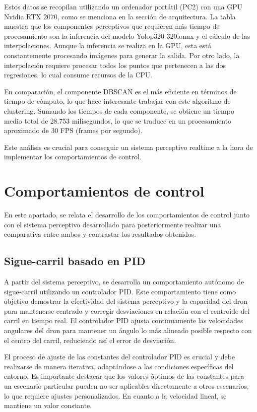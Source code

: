 Estos datos se recopilan utilizando un ordenador portátil (PC2) con una GPU Nvidia RTX 2070, como se menciona en la sección de arquitectura. La tabla muestra que los 
componentes perceptivos que requieren más tiempo de procesamiento son la inferencia del modelo Yolop320-320.onnx y el cálculo de las interpolaciones. 
Aunque la inferencia se realiza en la GPU, esta está constantemente procesando imágenes para generar la salida. Por otro lado, la interpolación 
requiere procesar todos los puntos que pertenecen a las dos regresiones, lo cual consume recursos de la CPU.

En comparación, el componente DBSCAN es el más eficiente en términos de tiempo de cómputo, lo que hace interesante trabajar con este algoritmo de clustering. 
Sumando los tiempos de cada componente, se obtiene un tiempo medio total de 28.753 milisegundos, lo que se traduce en un procesamiento aproximado de 30 FPS (frames por segundo). 

Este análisis es crucial para conseguir un sistema perceptivo realtime a la hora de implementar los comportamientos de control. 

  \section{Comportamientos de control}
  \label{sec:Control}

  En este apartado, se relata el desarrollo de los comportamientos de control junto con el sistema perceptivo desarrollado para posteriormente realizar 
  una comparativa entre ambos y contrastar los resultados obtenidos.

\subsection{Sigue-carril basado en PID}
\label{sec:Control}

A partir del sistema perceptivo, se desarrolla un comportamiento autónomo de sigue-carril utilizando un controlador PID. Este comportamiento tiene como objetivo
demostrar la efectividad del sistema perceptivo y la capacidad del dron para mantenerse centrado y corregir desviaciones en relación
con el centroide del carril en tiempo real. El controlador PID ajusta continuamente las velocidades angulares del dron para mantener un ángulo lo más alineado posible respecto con el
centro del carril, reduciendo así el error de desviación.

El proceso de ajuste de las constantes del controlador PID es crucial y debe realizarse de manera iterativa, adaptándose a las condiciones específicas del entorno. Es importante
destacar que los valores óptimos de las constantes para un escenario particular pueden no ser aplicables directamente a otros escenarios, lo que requiere ajustes personalizados. 
En cuanto a la velocidad lineal, se mantiene un valor constante.\newline

